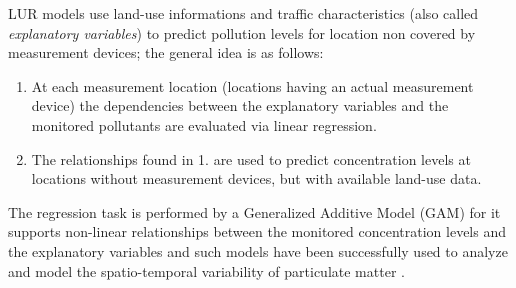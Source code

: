 \documentclass[11pt,a4paper,titlepage]{book}
\begin{document}
LUR models use land-use informations and traffic characteristics (also called \textit{explanatory variables}) to predict pollution levels for location non covered by measurement devices; the general idea is as follows:
\begin{enumerate}
    \item At each measurement location (locations having an actual measurement device) the dependencies between the explanatory variables and the monitored pollutants are evaluated via linear regression.
    \item The relationships found in 1. are used to predict concentration levels at locations without measurement devices, but with available land-use data.
\end{enumerate}
The regression task is performed by a Generalized Additive Model (GAM) for it supports non-linear relationships between the monitored concentration levels and the explanatory variables and such models have been successfully used to analyze and model the spatio-temporal variability of particulate matter \cite{meteo-influence-pm}.
\end{document}
